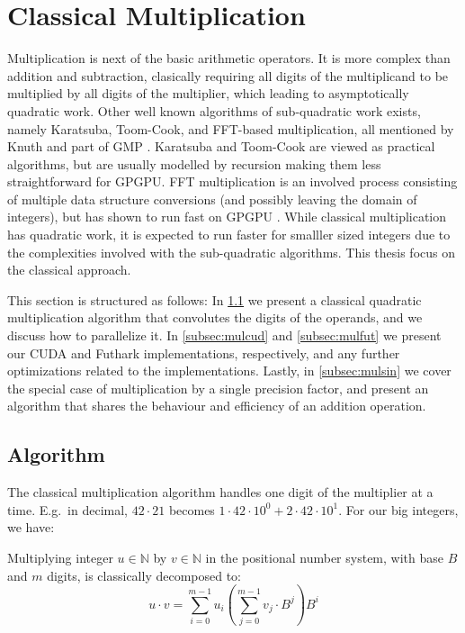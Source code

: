 \section{Classical Multiplication}
\label{sec:mul}

Multiplication is next of the basic arithmetic operators. It is more complex
than addition and subtraction, clasically requiring all digits of the
multiplicand to be multiplied by all digits of the multiplier, which leading to
asymptotically quadratic work. Other well known algorithms of sub-quadratic work
exists, namely Karatsuba, Toom-Cook, and FFT-based multiplication, all mentioned
by Knuth and part of GMP \cite{GMP,knuth97}. Karatsuba and Toom-Cook are viewed
as practical algorithms, but are usually modelled by recursion making them less
straightforward for GPGPU. FFT multiplication is an involved process consisting
of multiple data structure conversions (and possibly leaving the domain of
integers), but has shown to run fast on GPGPU \cite{Bantikyan2014BigIM,
  oancea2024gpu}. While classical multiplication has quadratic work, it is
expected to run faster for smalller sized integers due to the complexities
involved with the sub-quadratic algorithms. This thesis focus on the classical
approach.

This section is structured as follows: In \ref{subsec:mulalg} we present a
classical quadratic multiplication algorithm that convolutes the digits of the
operands, and we discuss how to parallelize it. In \ref{subsec:mulcud} and
\ref{subsec:mulfut} we present our CUDA and Futhark implementations,
respectively, and any further optimizations related to the
implementations. Lastly, in \ref{subsec:mulsin} we cover the special case
of multiplication by a single precision factor, and present an algorithm that
shares the behaviour and efficiency of an addition operation.

\subsection{Algorithm}
\label{subsec:mulalg}

The classical multiplication algorithm handles one digit of the multiplier at a
time. E.g.\ in decimal, $42\cdot 21$ becomes
$1 \cdot 42 \cdot 10^{0} + 2 \cdot 42 \cdot 10^{1}$. For our big integers, we have:

\begin{definition}\label{def:clasmul}
  Multiplying integer $u\in \mathbb{N}$ by $v \in \mathbb{N}$ in the positional number system, with
  base $B$ and $m$ digits, is classically decomposed to:
\begin{equation}
  \label{eq:clasmul0}
  u \cdot v = \sum_{i=0}^{m-1}u_i\left( \sum_{j=0}^{m-1}v_j\cdot B^{j} \right)B^{i}
\end{equation}
\end{definition}

